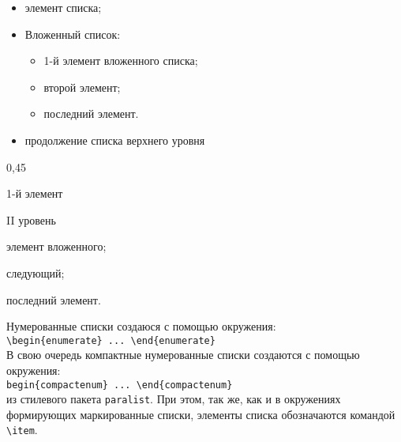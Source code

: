 \vspace{1ex}
\noindent
\begin{fmpage}[t]{0.45\textwidth}
\begin{itemize}
\item элемент списка;
\item{Вложенный список:
 \begin{itemize}
 \item 1-й элемент вложенного списка;
 \item второй элемент;
 \item последний элемент.
 \end{itemize}   
}
\item продолжение списка верхнего уровня

\end{itemize}
\end{fmpage}
\hfill
\begin{fmpage}[t]{0,45\textwidth}
\begin{compactitem}
	\item 1-й элемент
	\item II уровень
		\begin{compactitem}
			\item элемент вложенного;
			\item следующий;
		\end{compactitem}
	\item последний элемент.
\end{compactitem}
\end{fmpage}
Нумерованные списки создаюся с помощью окружения:\\
\verb|\begin{enumerate} ... \end{enumerate}|\\
В свою очередь компактные нумерованные списки создаются с помощью окружения:\\
\verb|begin{compactenum} ... \end{compactenum}|\\
из стилевого пакета \verb|paralist|. При этом, так же, как и в окружениях формирующих 
маркированные списки, элементы списка обозначаются командой \verb|\item|.


